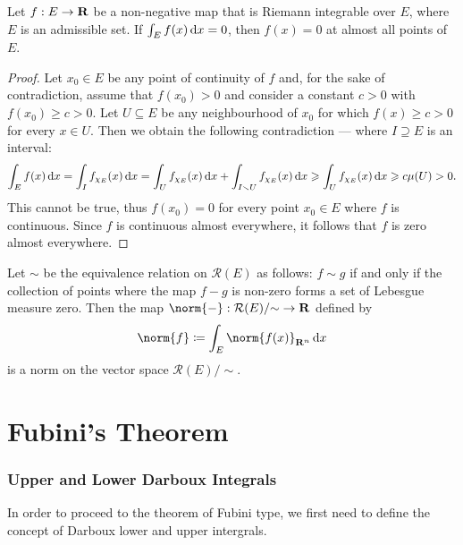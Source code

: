 \begin{lemma}
\label{lem:zero-integral-jordan-measure-zero}
Let \(f: E \to \mathbf{R}\) be a non-negative map that is Riemann integrable over
\(E\), where \(E\) is an admissible set. If \(\int_E f(x)\, \mathrm{d} x = 0\), then
\(f(x) = 0\) at almost all points of \(E\).
\end{lemma}

\begin{proof}
Let \(x_0 \in E\) be any point of continuity of \(f\) and, for the sake of
contradiction, assume that \(f(x_0) > 0\) and consider a constant \(c > 0\) with
\(f(x_0) \geq c > 0\). Let \(U \subseteq E\) be any neighbourhood of \(x_0\) for
which \(f(x) \geq c > 0\) for every \(x \in U\). Then we obtain the following
contradiction --- where \(I \supseteq E\) is an interval:
\[
  \int_E f(x)\, \mathrm{d} x
  = \int_I f_{\chi_{E}}(x)\, \mathrm{d} x
  = \int_U f_{\chi_E}(x)\, \mathrm{d} x
  + \int_{I \smallsetminus U} f_{\chi_{E}}(x)\, \mathrm{d} x
  \geqslant \int_U f_{\chi_{E}}(x)\, \mathrm{d} x
  \geqslant c \mu(U) > 0.
\]
This cannot be true, thus \(f(x_0) = 0\) for every point \(x_0 \in E\) where
\(f\) is continuous. Since \(f\) is continuous almost everywhere, it follows
that \(f\) is zero almost everywhere.
\end{proof}

\begin{corollary}
\label{cor:norm-riemann-integral}
Let \(\sim\) be the equivalence relation on \(\mathcal R(E)\) as follows: \(f
\sim g\) if and only if the collection of points where the map \(f - g\) is
non-zero forms a set of Lebesgue measure zero. Then the map \(\norm{-}:
\mathcal R(E)/{\sim} \to \R\) defined by
\[
  \norm{f} \coloneq \int_E \norm{f(x)}_{\R^n}\, \diff x
\]
is a norm on the vector space \(\mathcal R(E)/{\sim}\).
\end{corollary}

\section{Fubini's Theorem}

\subsubsection{Upper and Lower Darboux Integrals}

In order to proceed to the theorem of Fubini type, we first need to define the
concept of Darboux lower and upper intergrals.

